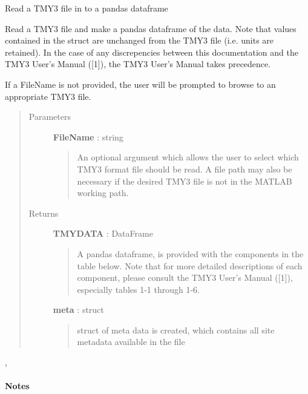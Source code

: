 \documentclass[letterpaper,10pt,english]{sphinxmanual}
\begin{document}
\begin{fulllineitems}
\label{stubs/pvlib.pvl_readtmy3:pvlib.pvl_readtmy3}
Read a TMY3 file in to a pandas dataframe

Read a TMY3 file and make a pandas dataframe of the data. Note that values
contained in the struct are unchanged from the TMY3 file (i.e. units 
are retained). In the case of any discrepencies between this
documentation and the TMY3 User's Manual ({[}1{]}), the TMY3 User's Manual
takes precedence.

If a FileName is not provided, the user will be prompted to browse to
an appropriate TMY3 file.
\begin{quote}\begin{description}
\item[{Parameters}] \leavevmode
\textbf{FileName} : string
\begin{quote}

An optional argument which allows the user to select which
TMY3 format file should be read. A file path may also be necessary if
the desired TMY3 file is not in the MATLAB working path.
\end{quote}

\item[{Returns}] \leavevmode
\textbf{TMYDATA} : DataFrame
\begin{quote}

A pandas dataframe, is provided with the components in the table below. Note
that for more detailed descriptions of each component, please consult
the TMY3 User's Manual ({[}1{]}), especially tables 1-1 through 1-6.
\end{quote}

\textbf{meta} : struct
\begin{quote}

struct of meta data is created, which contains all 
site metadata available in the file
\end{quote}

\end{description}\end{quote}




{\hyperref[stubs/pvlib.pvl_makelocationstruct:pvlib.pvl_makelocationstruct]{}}, {\hyperref[stubs/pvlib.pvl_readtmy2:pvlib.pvl_readtmy2]{}}


\paragraph{Notes}


\end{fulllineitems}
\end{document}
